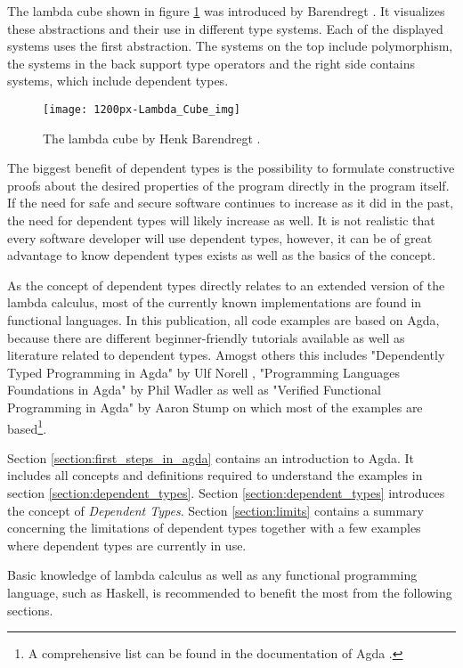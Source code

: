 The lambda cube shown in figure \ref{fig:lambda_cube} was introduced by Barendregt \cite{lambda_cube}. It visualizes these abstractions and their use in different type systems. Each of the displayed systems uses the first abstraction. 
The systems on the top include polymorphism, the systems in the back support type operators and the right side contains systems, which include dependent types.
\begin{figure}[h]
\centering
\texttt{[image: 1200px-Lambda\_Cube\_img]}
\caption{The lambda cube by Henk Barendregt \cite{lambda_cube}.}
\label{fig:lambda_cube}
\end{figure}

The biggest benefit of dependent types is the possibility to formulate constructive proofs about the desired properties of the program directly in the program itself.
If the need for safe and secure software continues to increase as it did in the past, the need for dependent types will likely increase as well.
It is not realistic that every software developer will use dependent types, however, it can be of great advantage to know dependent types exists as well as the basics of the concept.

As the concept of dependent types directly relates to an extended version of the lambda calculus, most of the currently known implementations are found in functional languages.
In this publication, all code examples are based on Agda, because there are different beginner-friendly tutorials available as well as literature related to dependent types. 
Amogst others this includes "Dependently Typed Programming in Agda" by Ulf Norell \cite{norell:deptyped}, "Programming Languages Foundations in Agda" by Phil Wadler \cite{plfa2019} as well as "Verified Functional Programming in Agda" by Aaron Stump \cite{10.1145/2841316} on which most of the examples are based\footnote{A comprehensive list can be found in the documentation of Agda \cite{AgdaReadTheDocs}.}.

Section \ref{section:first_steps_in_agda} contains an introduction to Agda.
It includes all concepts and definitions required to understand the examples in section \ref{section:dependent_types}.
Section \ref{section:dependent_types} introduces the concept of \emph{Dependent Types}.
Section \ref{section:limits} contains a summary concerning the limitations of dependent types together with a few examples where dependent types are currently in use.

Basic knowledge of lambda calculus as well as any functional programming language, such as Haskell, is recommended to benefit the most from the following sections.
